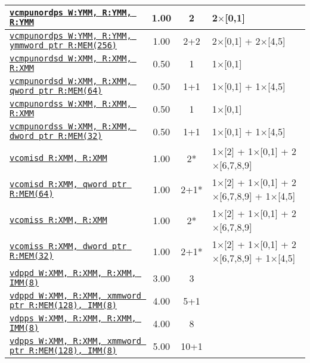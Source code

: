 \documentclass[a4paper,english,fontsize=9]{scrartcl}
\begin{document}
\begin{longtable}{p{}ccL{.25\textwidth}}
  \midrule
  \texttt{\href{https://felixcloutier.com/x86/CMPPS.html}{vcmpunordps W:YMM, R:YMM, R:YMM}} & 1.00 & 2 & 2\(\times\)[0,1] \\
  \midrule
  \texttt{\href{https://felixcloutier.com/x86/CMPPS.html}{vcmpunordps W:YMM, R:YMM, ymmword ptr R:MEM(256)}} & 1.00 & 2+2 & 2\(\times\)[0,1] + 2\(\times\)[4,5] \\
  \midrule
  \texttt{\href{https://felixcloutier.com/x86/CMPSD.html}{vcmpunordsd W:XMM, R:XMM, R:XMM}} & 0.50 & 1 & 1\(\times\)[0,1] \\
  \midrule
  \texttt{\href{https://felixcloutier.com/x86/CMPSD.html}{vcmpunordsd W:XMM, R:XMM, qword ptr R:MEM(64)}} & 0.50 & 1+1 & 1\(\times\)[0,1] + 1\(\times\)[4,5] \\
  \midrule
  \texttt{\href{https://felixcloutier.com/x86/CMPSS.html}{vcmpunordss W:XMM, R:XMM, R:XMM}} & 0.50 & 1 & 1\(\times\)[0,1] \\
  \midrule
  \texttt{\href{https://felixcloutier.com/x86/CMPSS.html}{vcmpunordss W:XMM, R:XMM, dword ptr R:MEM(32)}} & 0.50 & 1+1 & 1\(\times\)[0,1] + 1\(\times\)[4,5] \\
  \midrule
  \texttt{\href{https://felixcloutier.com/x86/COMISD.html}{vcomisd R:XMM, R:XMM}} & 1.00 & 2* & 1\(\times\)[2] + 1\(\times\)[0,1] + 2\(\times\)[6,7,8,9] \\
  \midrule
  \texttt{\href{https://felixcloutier.com/x86/COMISD.html}{vcomisd R:XMM, qword ptr R:MEM(64)}} & 1.00 & 2+1* & 1\(\times\)[2] + 1\(\times\)[0,1] + 2\(\times\)[6,7,8,9] + 1\(\times\)[4,5] \\
  \midrule
  \texttt{\href{https://felixcloutier.com/x86/COMISS.html}{vcomiss R:XMM, R:XMM}} & 1.00 & 2* & 1\(\times\)[2] + 1\(\times\)[0,1] + 2\(\times\)[6,7,8,9] \\
  \midrule
  \texttt{\href{https://felixcloutier.com/x86/COMISS.html}{vcomiss R:XMM, dword ptr R:MEM(32)}} & 1.00 & 2+1* & 1\(\times\)[2] + 1\(\times\)[0,1] + 2\(\times\)[6,7,8,9] + 1\(\times\)[4,5] \\
  \midrule
  \texttt{\href{https://felixcloutier.com/x86/DPPD.html}{vdppd W:XMM, R:XMM, R:XMM, IMM(8)}} & 3.00 & 3 &  \\
  \midrule
  \texttt{\href{https://felixcloutier.com/x86/DPPD.html}{vdppd W:XMM, R:XMM, xmmword ptr R:MEM(128), IMM(8)}} & 4.00 & 5+1 &  \\
  \midrule
  \texttt{\href{https://felixcloutier.com/x86/DPPS.html}{vdpps W:XMM, R:XMM, R:XMM, IMM(8)}} & 4.00 & 8 &  \\
  \midrule
  \texttt{\href{https://felixcloutier.com/x86/DPPS.html}{vdpps W:XMM, R:XMM, xmmword ptr R:MEM(128), IMM(8)}} & 5.00 & 10+1 &  \\

\end{longtable}
\end{document}
